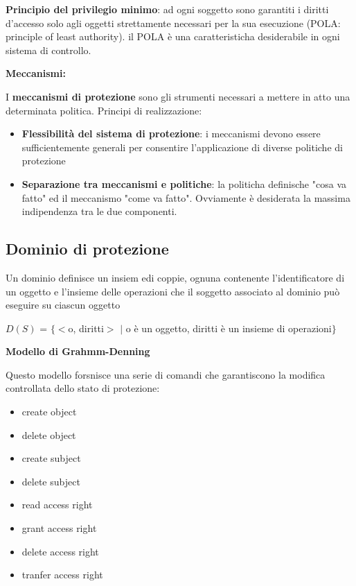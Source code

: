\documentclass{article}
\begin{document}
\vspace{3mm}
\textbf{Principio del privilegio minimo}: ad ogni soggetto sono garantiti i diritti d'accesso solo agli oggetti strettamente necessari per la sua esecuzione
(POLA: principle of least authority). il POLA è una caratteristicha desiderabile in ogni sistema di controllo.
\vspace{3mm}

\textbf{Meccanismi:}

I \textbf{meccanismi di protezione} sono gli strumenti necessari a mettere in atto una determinata politica.
Principi di realizzazione:
\begin{itemize}
    \item \textbf{Flessibilità del sistema di protezione}: i meccanismi devono essere sufficientemente generali per consentire l'applicazione di diverse politiche 
    di protezione
    \item \textbf{Separazione tra meccanismi e politiche}: la politicha definische "cosa va fatto" ed il meccanismo "come va fatto". Ovviamente è desiderata la
    massima indipendenza tra le due componenti.
\end{itemize}

\subsection{Dominio di protezione}
Un dominio definisce un insiem edi coppie, ognuna contenente l'identificatore di un oggetto e l'insieme delle operazioni che il soggetto associato al
dominio può eseguire su ciascun oggetto

\vspace{3mm}
$D(S)$ = $\{$$<$o, diritti$>$ $|$ o è un oggetto, diritti è un insieme di operazioni$\}$
\vspace{3mm}

\textbf{Modello di Grahmm-Denning}

Questo modello forsnisce una serie di comandi che garantiscono la modifica controllata dello stato di protezione:
\begin{itemize}
    \item create object
    \item delete object
    \item create subject
    \item delete subject
    \item read access right
    \item grant access right
    \item delete access right
    \item tranfer access right
\end{itemize}
\end{document}
